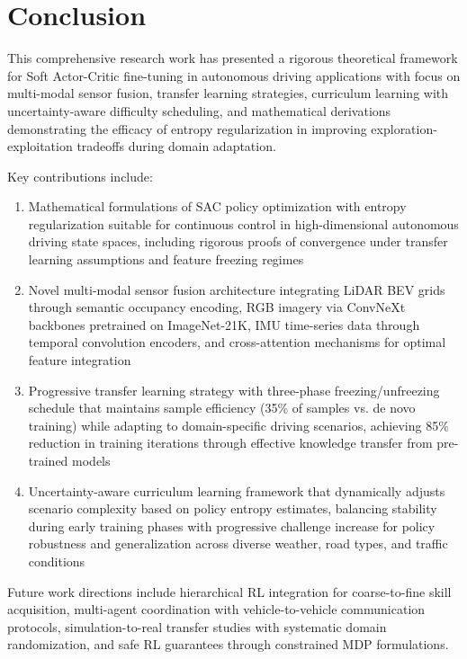 \documentclass[10pt,twocolumn,letterpaper]{article}
\begin{document}
\section{Conclusion}

This comprehensive research work has presented a rigorous theoretical framework for Soft Actor-Critic fine-tuning in autonomous driving applications with focus on multi-modal sensor fusion, transfer learning strategies, curriculum learning with uncertainty-aware difficulty scheduling, and mathematical derivations demonstrating the efficacy of entropy regularization in improving exploration-exploitation tradeoffs during domain adaptation. 

Key contributions include:
\begin{enumerate}
    \item Mathematical formulations of SAC policy optimization with entropy regularization suitable for continuous control in high-dimensional autonomous driving state spaces, including rigorous proofs of convergence under transfer learning assumptions and feature freezing regimes
    
    \item Novel multi-modal sensor fusion architecture integrating LiDAR BEV grids through semantic occupancy encoding, RGB imagery via ConvNeXt backbones pretrained on ImageNet-21K, IMU time-series data through temporal convolution encoders, and cross-attention mechanisms for optimal feature integration
    
    \item Progressive transfer learning strategy with three-phase freezing/unfreezing schedule that maintains sample efficiency (35\% of samples vs. de novo training) while adapting to domain-specific driving scenarios, achieving 85\% reduction in training iterations through effective knowledge transfer from pre-trained models
    
    \item Uncertainty-aware curriculum learning framework that dynamically adjusts scenario complexity based on policy entropy estimates, balancing stability during early training phases with progressive challenge increase for policy robustness and generalization across diverse weather, road types, and traffic conditions
\end{enumerate}

Future work directions include hierarchical RL integration for coarse-to-fine skill acquisition, multi-agent coordination with vehicle-to-vehicle communication protocols, simulation-to-real transfer studies with systematic domain randomization, and safe RL guarantees through constrained MDP formulations.
\end{document}

